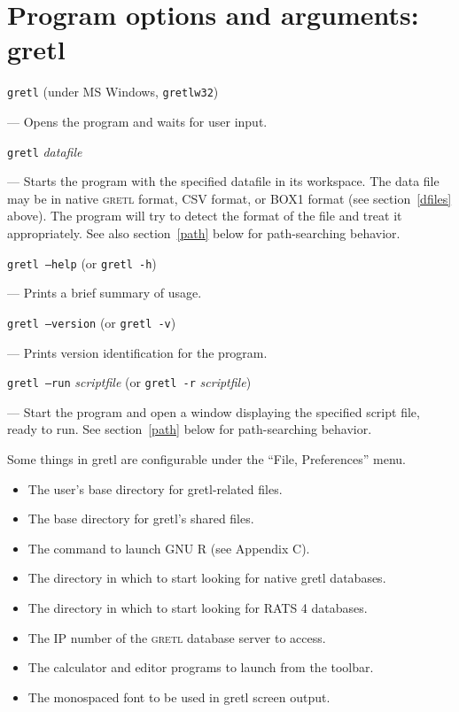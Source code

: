 \documentclass{article}
\begin{document}
{
\setlength{\parindent}{0pt}
\setlength{\parskip}{8pt}

\section{Program options and arguments: gretl}
\label{optarg1}

\texttt{gretl}  \qquad (under MS Windows, \texttt{gretlw32})

--- Opens the program and waits for user input.

\texttt{gretl} \textit{datafile}  

--- Starts the program with the specified datafile in its workspace.
The data file may be in native \textsc{gretl} format, CSV format, or
BOX1 format (see section~\ref{dfiles} above).  The program will try to
detect the format of the file and treat it appropriately.  See also
section~\ref{path} below for path-searching behavior.

\texttt{gretl --help} (or \texttt{gretl -h})

--- Prints a brief summary of usage.

\texttt{gretl --version} (or \texttt{gretl -v})

--- Prints version identification for the program.

\texttt{gretl --run} \textit{scriptfile} (or \texttt{gretl -r}
\textit{scriptfile})

--- Start the program and open a window displaying the specified
script file, ready to run.  See section~\ref{path} below for
path-searching behavior.


Some things in \textsf{gretl} are configurable under the ``File,
Preferences'' menu.  

\begin{itemize}
\item The user's base directory for \textsf{gretl}-related files.
\item The base directory for \textsf{gretl}'s shared files.
\item The command to launch GNU R (see Appendix C).
\item The directory in which to start looking for native
  \textsf{gretl} databases.
\item The directory in which to start looking for RATS 4 databases.
\item The IP number of the \textsc{gretl} database server to access.
\item The calculator and editor programs to launch from the toolbar.
\item The monospaced font to be used in \textsf{gretl} screen output.
\end{itemize}

}
\end{document}
